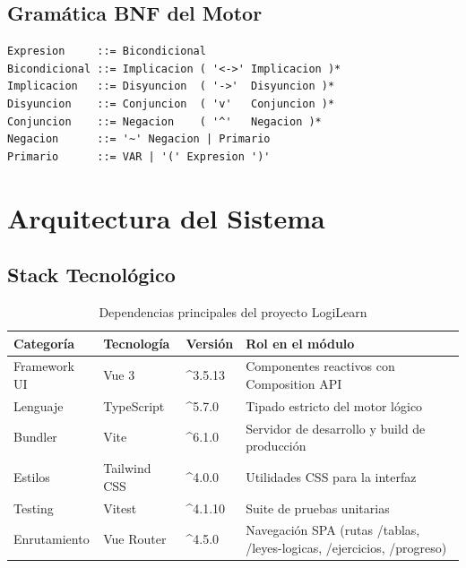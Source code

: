 \documentclass[11pt,a4paper]{article}
\begin{document}
\subsection{Gramática BNF del Motor}
\begin{verbatim}
Expresion     ::= Bicondicional
Bicondicional ::= Implicacion ( '<->' Implicacion )*
Implicacion   ::= Disyuncion  ( '->'  Disyuncion )*
Disyuncion    ::= Conjuncion  ( 'v'   Conjuncion )*
Conjuncion    ::= Negacion    ( '^'   Negacion )*
Negacion      ::= '~' Negacion | Primario
Primario      ::= VAR | '(' Expresion ')'
\end{verbatim}

\section{Arquitectura del Sistema}

\subsection{Stack Tecnológico}
\begin{table}[H]
\centering
\caption{Dependencias principales del proyecto LogiLearn}
\label{tab:stack}
\small
\begin{tabularx}{\textwidth}{llp{2cm}X}
\toprule
\textbf{Categoría} & \textbf{Tecnología} & \textbf{Versión} & \textbf{Rol en el módulo} \\
\midrule
Framework UI & Vue 3 & \textasciicircum 3.5.13 & Componentes reactivos con Composition API \\
Lenguaje & TypeScript & \textasciicircum 5.7.0 & Tipado estricto del motor lógico \\
Bundler & Vite & \textasciicircum 6.1.0 & Servidor de desarrollo y build de producción \\
Estilos & Tailwind CSS & \textasciicircum 4.0.0 & Utilidades CSS para la interfaz \\
Testing & Vitest & \textasciicircum 4.1.10 & Suite de pruebas unitarias \\
Enrutamiento & Vue Router & \textasciicircum 4.5.0 & Navegación SPA (rutas /tablas, /leyes-logicas, /ejercicios, /progreso) \\
\bottomrule
\end{tabularx}
\end{table}
\end{document}
